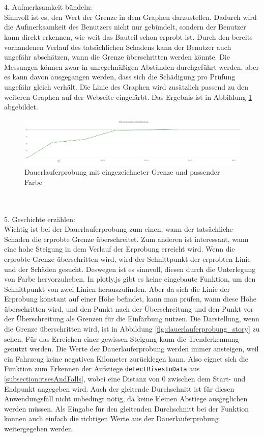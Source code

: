 \\\\
 4. Aufmerksamkeit bündeln:\\
Sinnvoll ist es, den Wert der Grenze in dem Graphen darzustellen. Dadurch wird die Aufmerksamkeit des Benutzers nicht nur gebündelt, sondern der Benutzer kann direkt erkennen, wie weit das Bauteil schon erprobt ist. Durch den bereits vorhandenen Verlauf des tatsächlichen Schadens kann der Benutzer auch ungefähr abschätzen, wann die Grenze überschritten werden könnte. Die Messungen können zwar in unregelmäßigen Abständen durchgeführt werden, aber es kann davon ausgegangen werden, dass sich die Schädigung pro Prüfung ungefähr gleich verhält. Die Linie des Graphen wird zusätzlich passend zu den weiteren Graphen auf der Webseite eingefärbt. Das Ergebnis ist in Abbildung \ref{fig:dauerlauferprobung_aufmerksamkeit} abgebildet.
\begin{figure}[!h]
    \centering
    \includegraphics[width=1\linewidth]{gfx/dauerlauferprobung_aufmerksamkeit.png}
    \caption{Dauerlauferprobung mit eingezeichneter Grenze und passender Farbe}
    \label{fig:dauerlauferprobung_aufmerksamkeit}
\end{figure}
\\\\
 5. Geschichte erzählen:\\
Wichtig ist bei der Dauerlauferprobung zum einen, wann der tatsächliche Schaden die erprobte Grenze überschreitet. Zum anderen ist interessant, wann eine hohe Steigung in dem Verlauf der Erprobung erreicht wird. Wenn die erprobte Grenze überschritten wird, wird der Schnittpunkt der erprobten Linie und der Schäden gesucht. Deswegen ist es sinnvoll, diesen durch die Unterlegung von Farbe hervorzuheben. In plotly.js gibt es keine eingebaute Funktion, um den Schnittpunkt von zwei Linien herauszufinden. Aber da sich die Linie der Erprobung konstant auf einer Höhe befindet, kann man prüfen, wann diese Höhe überschritten wird, und den Punkt nach der Überschreitung und den Punkt vor der Überschreitung als Grenzen für die Einfärbung nutzen. Die Darstellung, wenn die Grenze überschritten wird, ist in Abbildung \ref{fig:dauerlauferprobung_story} zu sehen. Für das Erreichen einer gewissen Steigung kann die Trenderkennung genutzt werden. Die Werte der Dauerlauferprobung werden immer ansteigen, weil ein Fahrzeug keine negativen Kilometer zurücklegen kann. Also eignet sich die Funktion zum Erkennen der Aufstiege \texttt{detectRisesInData} aus \ref{subsection:risesAndFalls}, wobei eine Distanz von 0 zwischen dem Start- und Endpunkt angegeben wird. Auch der gleitende Durchschnitt ist für diesen Anwendungsfall nicht unbedingt nötig, da keine kleinen Abstiege ausgeglichen werden müssen. Als Eingabe für den gleitenden Durchschnitt bei der Funktion können auch einfach die richtigen Werte aus der Dauerlauferprobung weitergegeben werden.\\\\
